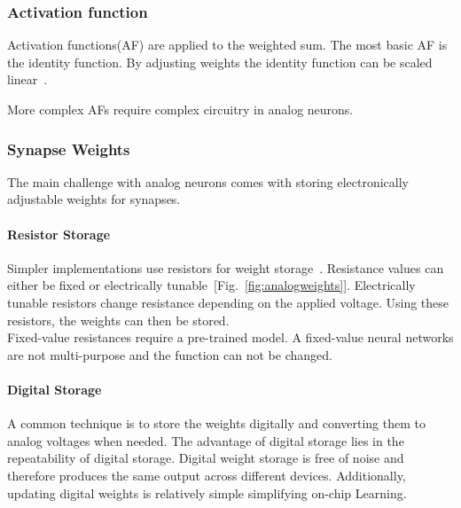 \documentclass[conference]{IEEEtran}
\begin{document}
    \subsubsection{Activation function}

    Activation functions(AF) are applied to the weighted sum.
    The most basic AF is the identity function.
    By adjusting weights the identity function can be scaled linear~\cite{zurada1992analog}.

    More complex AFs require complex circuitry in analog neurons.

    \subsubsection{Synapse Weights}
    The main challenge with analog neurons comes with storing electronically adjustable weights for synapses.



    \paragraph{Resistor Storage}
    Simpler implementations use resistors for weight storage~\cite{zurada1992analog}.
    Resistance values can either be fixed or electrically tunable~[Fig.~\ref{fig:analogweights}].
    Electrically tunable resistors change resistance depending on the applied voltage.
    Using these resistors, the weights can then be stored.\\
    Fixed-value resistances require a pre-trained model.
    A fixed-value neural networks are not multi-purpose and the function can not be changed.

    \paragraph{Digital Storage}
    A common technique is to store the weights digitally and converting them to analog voltages when needed.
    The advantage of digital storage lies in the repeatability of digital storage.
    Digital weight storage is free of noise and therefore produces the same output across different devices.
    Additionally, updating digital weights is relatively simple simplifying on-chip Learning.
\end{document}
